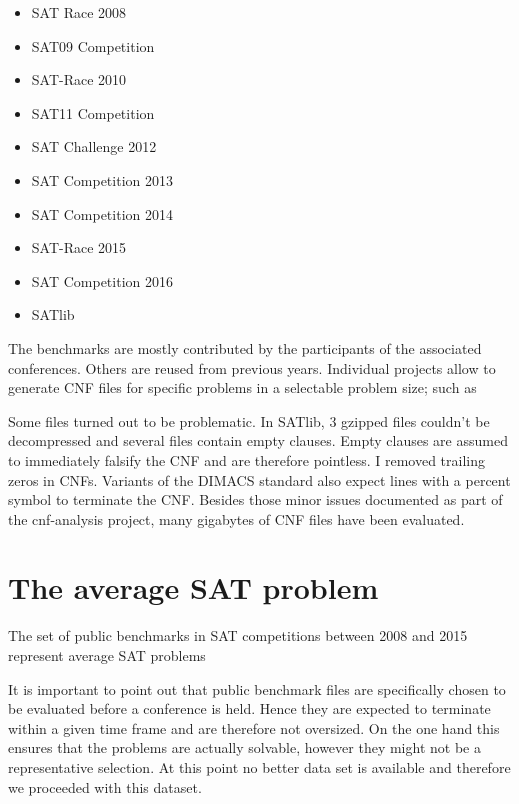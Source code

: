 \begin{itemize}
  \itemsep2pt
  \item SAT Race 2008
  \item SAT09 Competition
  \item SAT-Race 2010
  \item SAT11 Competition
  \item SAT Challenge 2012
  \item SAT Competition 2013
  \item SAT Competition 2014
  \item SAT-Race 2015
  \item SAT Competition 2016
  \item SATlib
\end{itemize}
The benchmarks are mostly contributed by the participants of the associated conferences.
Others are reused from previous years. Individual projects allow to generate CNF files
for specific problems in a selectable problem size; such as 

Some files turned out to be problematic. In SATlib, 3 gzipped files couldn't be decompressed and several files
contain empty clauses. Empty clauses are assumed to immediately falsify the CNF and are therefore pointless.
I removed trailing zeros in CNFs. Variants of the DIMACS standard also expect lines with a percent symbol to
terminate the CNF. Besides those minor issues documented as part of the cnf-analysis project,
many gigabytes of CNF files have been evaluated.

\section{The average SAT problem}
\label{sec:features-average}
%
\begin{prop}
  The set of public benchmarks in SAT competitions between 2008 and 2015
  represent average SAT problems
\end{prop}

It is important to point out that public benchmark files are specifically chosen
to be evaluated before a conference is held. Hence they are expected to terminate
within a given time frame and are therefore not oversized. On the one hand this
ensures that the problems are actually solvable, however they might not be a
representative selection. At this point no better data set is available and therefore
we proceeded with this dataset.

